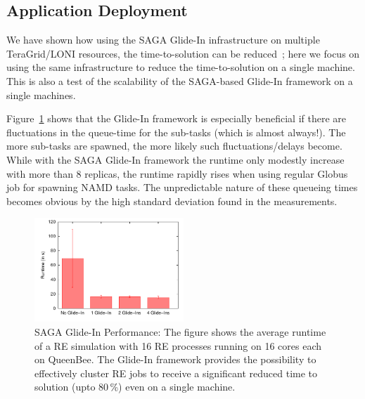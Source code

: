 \documentclass[conference,final]{IEEEtran}
\newcommand{\up}{\vspace*{-1em}}
\begin{document}
\up

\subsection{Application Deployment}

\up


We have shown how using the SAGA Glide-In infrastructure on multiple
TeraGrid/LONI resources, the time-to-solution can be
reduced~\cite{Luckow:2008la}; here we focus on using the same
infrastructure to reduce the time-to-solution on a single machine.
This is also a test of the scalability of the SAGA-based Glide-In
framework on a single machines. %

Figure~\ref{fig:perf_remd_glidin} shows that the Glide-In framework is
especially beneficial if there are fluctuations in the queue-time for
the sub-tasks (which is almost always!). The more sub-tasks are
spawned, the more likely such fluctuations/delays become. While with
the SAGA Glide-In framework the runtime only modestly increase with
more than 8 replicas, the runtime rapidly rises when using regular
Globus job for spawning NAMD tasks. The unpredictable nature of these
queueing times becomes obvious by the high standard deviation found in
the measurements.


\begin{figure}[htbp]
        \includegraphics[width=0.5\textwidth]{perf_glidein.pdf}
        \caption{SAGA Glide-In Performance: The figure shows the
          average runtime of a RE simulation with 16 RE processes
          running on 16 cores each on QueenBee.  The Glide-In
          framework provides the possibility to effectively cluster RE
          jobs to receive a significant reduced time to solution (upto
          80\,\%) even on a single machine.}
    \label{fig:perf_remd_glidin}
\end{figure}
\end{document}
